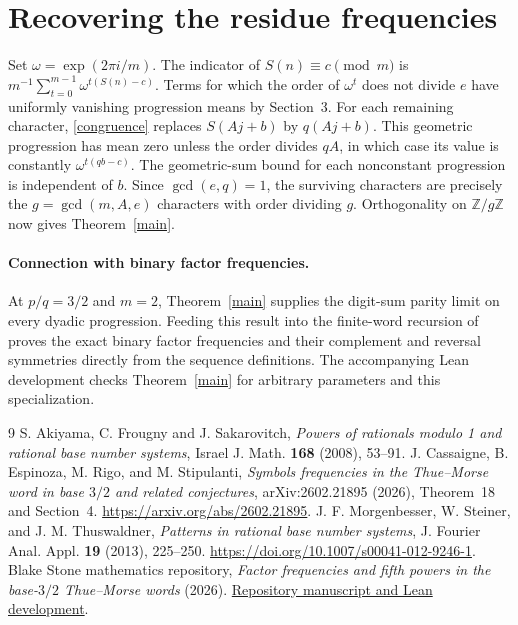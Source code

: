\documentclass[11pt]{article}
\newcommand{\Z}{\mathbb Z}
\begin{document}
\section{Recovering the residue frequencies}
Set $\omega=\exp(2\pi i/m)$. The indicator of $S(n)\equiv c\pmod m$
is $m^{-1}\sum_{t=0}^{m-1}\omega^{t(S(n)-c)}$. Terms for which the
order of $\omega^t$ does not divide $e$ have uniformly vanishing
progression means by Section~3. For each remaining character,
\eqref{congruence} replaces $S(Aj+b)$ by $q(Aj+b)$.
This geometric progression has mean zero unless the order divides
$qA$, in which case its value is constantly $\omega^{t(qb-c)}$.
The geometric-sum bound for each nonconstant progression is independent
of $b$. Since $\gcd(e,q)=1$, the surviving characters are precisely
the $g=\gcd(m,A,e)$ characters with order dividing $g$.
Orthogonality on $\Z/g\Z$ now gives Theorem~\ref{main}.

\paragraph{Connection with binary factor frequencies.}
At $p/q=3/2$ and $m=2$, Theorem~\ref{main} supplies the digit-sum parity
limit on every dyadic progression. Feeding this result into the finite-word
recursion of \cite{factor} proves the exact binary factor frequencies and
their complement and reversal symmetries directly from the sequence definitions.
The accompanying Lean development checks Theorem~\ref{main} for arbitrary
parameters and this specialization.

\begin{thebibliography}{9}
 S. Akiyama, C. Frougny and J. Sakarovitch, \emph{Powers of rationals
modulo 1 and rational base number systems}, Israel J. Math. \textbf{168} (2008),
53--91.
 J. Cassaigne, B. Espinoza, M. Rigo, and M. Stipulanti,
\emph{Symbols frequencies in the Thue--Morse word in base $3/2$ and related conjectures},
arXiv:2602.21895 (2026), Theorem~18 and Section~4.
\url{https://arxiv.org/abs/2602.21895}.
 J. F. Morgenbesser, W. Steiner, and J. M. Thuswaldner,
\emph{Patterns in rational base number systems}, J. Fourier Anal. Appl.
\textbf{19} (2013), 225--250. \url{https://doi.org/10.1007/s00041-012-9246-1}.
 Blake Stone mathematics repository,
\emph{Factor frequencies and fifth powers in the base-$3/2$ Thue--Morse words}
(2026). \href{https://github.com/blakestone-x/math/tree/9abc19936fb4297de972941c1aad6b4659da5610/Dekking-base-three-halves}{Repository manuscript and Lean development}.
\end{thebibliography}
\end{document}
